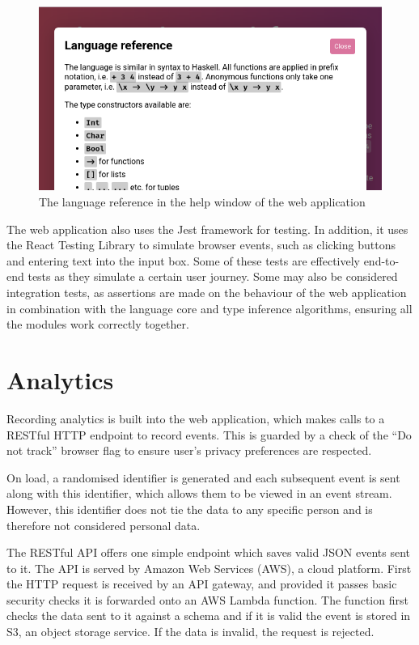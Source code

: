 \documentclass[a4paper,fleqn,oneside,12pt]{report}
\begin{document}
{\centering \begin{figure}[h!]
  \centering
  \includegraphics[width=0.9\linewidth]{images/help.png}
  \caption{The language reference in the help window of the web application}
\end{figure} \par}

The web application also uses the Jest framework for testing. In addition, it uses the React Testing Library to simulate browser events, such as clicking buttons and entering text into the input box. Some of these tests are effectively end-to-end tests as they simulate a certain user journey. Some may also be considered integration tests, as assertions are made on the behaviour of the web application in combination with the language core and type inference algorithms, ensuring all the modules work correctly together.

\section{Analytics}\label{id:h.39bhrrv1fi5p}

Recording analytics is built into the web application, which makes calls to a RESTful HTTP endpoint to record events. This is guarded by a check of the ``Do not track'' browser flag to ensure user's privacy preferences are respected.

On load, a randomised identifier is generated and each subsequent event is sent along with this identifier, which allows them to be viewed in an event stream. However, this identifier does not tie the data to any specific person and is therefore not considered personal data.

The RESTful API offers one simple endpoint which saves valid JSON events sent to it. The API is served by Amazon Web Services (AWS), a cloud platform. First the HTTP request is received by an API gateway, and provided it passes basic security checks it is forwarded onto an AWS Lambda function. The function first checks the data sent to it against a schema and if it is valid the event is stored in S3, an object storage service. If the data is invalid, the request is rejected.
\end{document}
